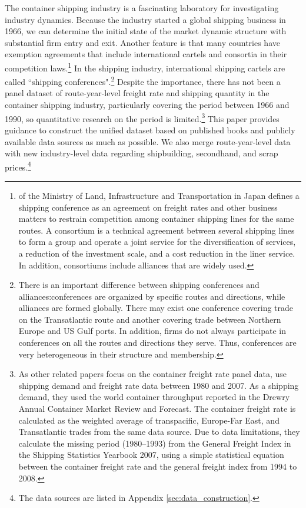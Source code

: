 \documentclass[11pt]{article}
\begin{document}
The container shipping industry is a fascinating laboratory for investigating industry dynamics. Because the industry started a global shipping business in 1966, we can determine the initial state of the market dynamic structure with substantial firm entry and exit. Another feature is that many countries have exemption agreements that include international cartels and consortia in their competition laws.\footnote{\cite{Anteitekina_kokusaikaijouyusoukakuhonotameno_kaijiseisakuno_arikatanitsuite2007} of the Ministry of Land, Infrastructure and Transportation in Japan defines a shipping conference as an agreement on freight rates and other business matters to restrain competition among container shipping lines for the same routes. A consortium is a technical agreement between several shipping lines to form a group and operate a joint service for the diversification of services, a reduction of the investment scale, and a cost reduction in the liner service. In addition, consortiums include alliances that are widely used. } In the shipping industry, international shipping cartels are called ``shipping conferences".\footnote{There is an important difference between shipping conferences and alliances:conferences are organized by specific routes and directions, while alliances are formed globally. There may exist one conference covering trade on the Transatlantic route and another covering trade between Northern Europe and US Gulf ports. In addition, firms do not always participate in conferences on all the routes and directions they serve. Thus, conferences are very heterogeneous in their structure and membership.} Despite the importance, there has not been a panel dataset of route-year-level freight rate and shipping quantity in the container shipping industry, particularly covering the period between 1966 and 1990, so quantitative research on the period is limited.\footnote{As other related papers focus on the container freight rate panel data, \cite{luo2009econometric} use shipping demand and freight rate data between 1980 and 2007. As a shipping demand, they used the world container throughput reported in the Drewry Annual Container Market Review and Forecast. The container freight rate is calculated as the weighted average of transpacific, Europe-Far East, and Transatlantic trades from the same data source. Due to data limitations, they calculate the missing period (1980–1993) from the General Freight Index in the Shipping Statistics Yearbook 2007, using a simple statistical equation between the container freight rate and the general freight index from 1994 to 2008.} This paper provides guidance to construct the unified dataset based on published books and publicly available data sources as much as possible. We also merge route-year-level data with new industry-level data regarding shipbuilding, secondhand, and scrap prices.\footnote{The data sources are listed in Appendix \ref{sec:data_construction}.} 
\end{document}
